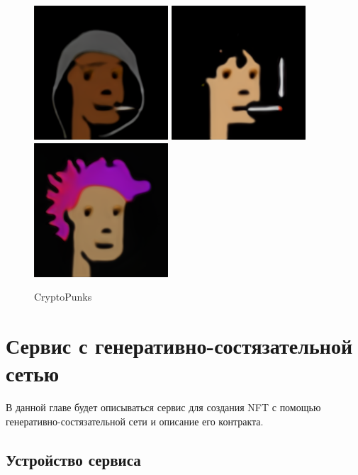 \begin{figure}
    \centering
    \includegraphics[height=50mm, width=.3\textwidth]{fig/cryptopunk_seed0085.png}\hfill
    \includegraphics[height=50mm, width=.3\textwidth]{fig/cryptopunk_seed0090.png}\hfill
    \includegraphics[height=50mm, width=.3\textwidth]{fig/cryptopunk_seed0265.png}
    \caption{CryptoPunks}
    \label{fig.cryptopunks_images_stylegan2}
\end{figure}

\section{Сервис с генеративно-состязательной сетью}
\label{section.ganservice}
  В данной главе будет описываться сервис для создания NFT с помощью генеративно-состязательной сети и описание его контракта.
\subsection{Устройство сервиса}

